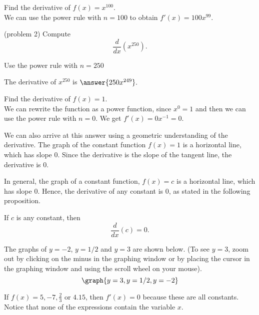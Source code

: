 \documentclass[handout]{ximera}
\begin{document}
\begin{example}[example 2]
Find the derivative of $f(x) = x^{100}$.\\
We can use the power rule with $n = 100$ to obtain $f'(x) = 100x^{99}.$
\end{example}

\begin{problem}(problem 2)
Compute
\[
\frac{d}{dx} \left(x^{250}\right).
\]
\begin{hint}
Use the power rule with $n = 250$
\end{hint}
The derivative of $x^{250}$ is $\answer{250x^{249}}.$
\end{problem}



\begin{example}[example 3]
Find the derivative of $f(x) = 1$.\\
We can rewrite the function as a power function, since $x^0 = 1$ and then we can use the power rule with $n=0$. We get $f'(x) = 0x^{-1} = 0$. 

\begin{remark}
We can also arrive at this answer using a geometric understanding of the derivative.
The graph of the constant function $f(x) = 1$ is a horizontal line, which has slope 0. 
Since the derivative is the slope of the tangent line, the derivative is 0.
\end{remark}
\end{example}


In general, the graph of a constant function, $f(x) = c$ is a horizontal line, which has slope 0.
Hence, the derivative of any constant is 0, as stated in the following proposition.

\begin{proposition}
If $c$ is any constant, then
\[
\frac{d}{dx} \left(c\right) = 0.
\]
\end{proposition}


The graphs of $y = -2$, $y = 1/2$ and $y = 3$ are shown below.
(To see $y=3$, zoom out by clicking on the minus in the graphing window or 
by placing the cursor in the graphing window and using the scroll wheel on your mouse).
\[
\graph{y = 3, y = 1/2, y = -2}
\]



\begin{example}[example 4]
If $f(x) = 5, -7, \frac23$ or $4.15$, then $f'(x) = 0$ 
because these are all constants. Notice that none of the expressions contain the variable $x$.
\end{example}
\end{document}
